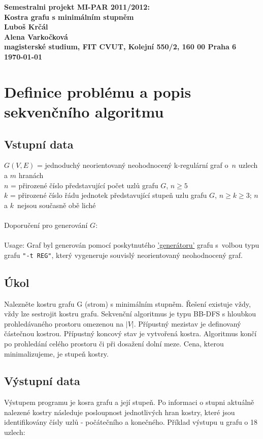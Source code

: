 \documentclass[]{article}
\begin{document}
\begin{center}
\bf Semestralni projekt MI-PAR 2011/2012:\\[5mm]
    Kostra grafu s minimálním stupněm\\[5mm] 
       Luboš Krčál\\
       Alena Varkočková\\[2mm]
magisterské studium, FIT CVUT, Kolejní 550/2, 160 00 Praha 6\\[2mm]
\today
\end{center}

\section{Definice problému a popis sekvenčního algoritmu}

\subsection{Vstupní data}
$G(V,E)$ = jednoduchý neorientovaný neohodnocený k-regulární graf o~$n$ uzlech a $m$ hranách\\
$n$ = přirozené číslo představující počet uzlů grafu $G$, $n \geq 5$\\
$k$ = přirozené číslo řádu jednotek představující stupeň uzlu grafu $G$, $n \geq k \geq 3$; $n$ a $k$~nejsou současně obě liché\\
\\
Doporučení pro generování $G$:\\
\\
Usage: Graf byl generován pomocí poskytnutého \href{''https://edux.fit.cvut.cz/courses/MI-PAR/labs/zadani_semestralnich_praci/generator_grafu'}{'generátoru'} grafu s~volbou typu grafu \texttt{"-t REG"}, který vygeneruje souvislý neorientovaný neohodnocený graf.

\subsection{Úkol}
Nalezněte kostru grafu G (strom) s minimálním stupněm. Řešení existuje vždy, vždy lze sestrojit kostru grafu. Sekvenční algoritmus je typu BB-DFS s hloubkou prohledávaného prostoru omezenou na $|V|$. Přípustný mezistav je definovaný částečnou kostrou. Přípustný koncový stav je vytvořená kostra. Algoritmus končí po prohledání celého prostoru či při dosažení dolní meze. Cena, kterou minimalizujeme, je stupeň kostry.

\subsection{Výstupní data}
Výstupem programu je kosra grafu a její stupeň. Po informaci o stupni aktuálně nalezené kostry následuje posloupnost jednotlivých hran kostry, které jsou identifikovány čísly uzlů - počátečního a konečného. Příklad výstupu u grafu o 18 uzlech:
\end{document}
